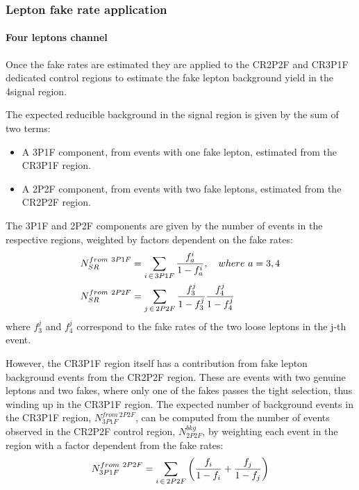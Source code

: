 \subsubsection{Lepton fake rate application}
\paragraph{Four leptons channel\\}
Once the fake rates are estimated they are applied to the CR2P2F and CR3P1F dedicated control regions to estimate the fake lepton background yield in the 4\Pl signal region.

The expected reducible background in the signal region is given by the sum of two terms:
\begin{itemize}
  \item A 3P1F component, from events with one fake lepton, estimated from the CR3P1F region.
  \item A 2P2F component, from events with two fake leptons, estimated from the CR2P2F region.
\end{itemize}

The 3P1F and 2P2F components are given by the number of events in the respective regions, weighted by factors dependent on the fake rates:
\begin{subequations}
  \begin{align}
    \label{eq:lepFR_3P1Fto4P}
    N^{from\ 3P1F}_{SR} &= \sum_{i \,\in\, 3P1F} \frac{f_a^i}{1-f_a^i}, \quad where\ a = 3, 4
    \\
    \label{eq:lepFR_2P2Fto4P}
    N^{from\ 2P2F}_{SR} &= \sum_{j \,\in\, 2P2F} \frac{f_3^j}{1-f_3^j} \frac{f_4^j}{1-f_4^j}
  \end{align}
\end{subequations}
where $f_3^j$ and $f_4^j$ correspond to the fake rates of the two loose leptons in the j-th event.

However, the CR3P1F region itself has a contribution from fake lepton background events from the CR2P2F region.
These are events with two genuine leptons and two fakes, where only one of the fakes passes the tight selection, thus winding up in the CR3P1F region.
The expected number of background events in the CR3P1F region, $N^{from\ 2P2F}_{3P1F}$,
can be computed from the number of events observed in the CR2P2F control region, $N^{bkg}_{2P2F}$,
by weighting each event in the region with a factor dependent from the fake rates:
\begin{equation}
  \label{eq:lepFR_N3P1F}
  N^{from\ 2P2F}_{3P1F} = \sum_{i \,\in\, 2P2F} \left( \frac{f_i}{1-f_i} + \frac{f_j}{1-f_j} \right)
\end{equation}

